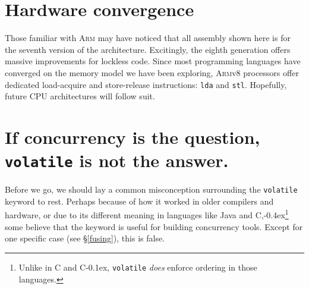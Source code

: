 \documentclass[fontsize=10pt, oneside]{scrartcl}
\newcommand{\punckern}{\kern-0.4ex}
\newcommand{\monobox}[1]{\mbox{\texttt{#1}}}
\newcommand{\keyword}[1]{\monobox{\color{darkGreen}#1}}
\newcommand{\cplusplus}[1]{C\kern-0.1ex\raisebox{0.15ex}{\texttt{++}}}
\newcommand{\clang}[1]{C}
\newcommand{\csharp}{C\raisebox{0.25ex}{\#}}
\newcommand{\secref}[1]{\hyperref[#1]{\textsc{\S}\ref*{#1}}}
\begin{document}
\section{Hardware convergence}

Those familiar with \textsc{Arm} may have noticed that all assembly shown here is for the seventh version of the architecture.
Excitingly, the eighth generation offers massive improvements for lockless code.
Since most programming languages have converged on the memory model we have been exploring,
\textsc{Arm}v8 processors offer dedicated load-acquire and store-release instructions: \keyword{lda} and \keyword{stl}.
Hopefully, future \textsc{CPU} architectures will follow suit.


\section{If concurrency is the question, \texttt{volatile} is not the answer.}

Before we go, we should lay a common misconception surrounding the \keyword{volatile} keyword to rest.
Perhaps because of how it worked in older compilers and hardware,
or due to its different meaning in languages like Java and \csharp,\punckern\footnote{Unlike in \clang{} and \cplusplus{},
\keyword{volatile} \emph{does} enforce ordering in those languages.}
some believe that the keyword is useful for building concurrency tools.
Except for one specific case (see \secref{fusing}), this is false.
\end{document}
